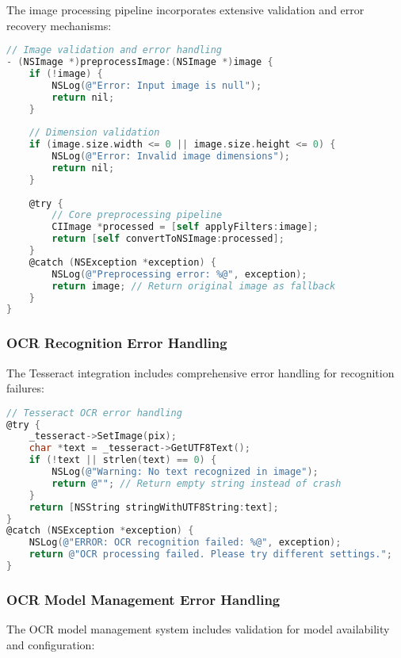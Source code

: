 The image processing pipeline incorporates extensive validation and error recovery mechanisms:

\begin{lstlisting}[language=C,basicstyle=\footnotesize\ttfamily,frame=single,breaklines=true,columns=flexible,showspaces=false,showstringspaces=false]
// Image validation and error handling
- (NSImage *)preprocessImage:(NSImage *)image {
    if (!image) {
        NSLog(@"Error: Input image is null");
        return nil;
    }
    
    // Dimension validation
    if (image.size.width <= 0 || image.size.height <= 0) {
        NSLog(@"Error: Invalid image dimensions");
        return nil;
    }
    
    @try {
        // Core preprocessing pipeline
        CIImage *processed = [self applyFilters:image];
        return [self convertToNSImage:processed];
    }
    @catch (NSException *exception) {
        NSLog(@"Preprocessing error: %@", exception);
        return image; // Return original image as fallback
    }
}
\end{lstlisting}

\subsubsection{OCR Recognition Error Handling}

The Tesseract integration includes comprehensive error handling for recognition failures:

\begin{lstlisting}[language=C,basicstyle=\footnotesize\ttfamily,frame=single,breaklines=true,columns=flexible,showspaces=false,showstringspaces=false]
// Tesseract OCR error handling
@try {
    _tesseract->SetImage(pix);
    char *text = _tesseract->GetUTF8Text();
    if (!text || strlen(text) == 0) {
        NSLog(@"Warning: No text recognized in image");
        return @""; // Return empty string instead of crash
    }
    return [NSString stringWithUTF8String:text];
}
@catch (NSException *exception) {
    NSLog(@"ERROR: OCR recognition failed: %@", exception);
    return @"OCR processing failed. Please try different settings.";
}
\end{lstlisting}

\subsubsection{OCR Model Management Error Handling}

The OCR model management system includes validation for model availability and configuration:

